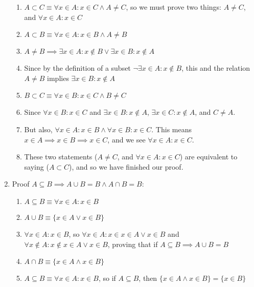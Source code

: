 \documentclass{article}
\begin{document}
\begin{enumerate}
\begin{enumerate}
                \item $A \subset C \equiv \forall x \in A: x \in C \land A \neq C$, so we must prove
                    two things: $A \neq C$, and $\forall x \in A: x \in C$
                \item $A \subset B \equiv \forall x \in A: x \in B \land A \neq B$
                \item $A \neq B \implies \exists x \in A: x \notin B \lor \exists x \in B: x \notin A$
                \item Since by the definition of a subset $\neg\exists x \in A:
                    x \notin B$, this and the relation $A \neq B$ implies
                    $\exists x \in B: x \notin A$
                \item $B \subset C \equiv \forall x \in B: x \in C \land B \neq C$
                \item Since $\forall x \in B: x \in C$ and $\exists x \in B: x
                    \notin A$, $\exists x \in C: x \notin A$, and $C \neq A$.
                \item But also, $\forall x \in A: x \in B \land \forall x \in B: x \in C$. This
                    means $x \in A \implies x \in B \implies x \in C$, and we see $\forall x \in A: x \in C$.
                \item These two statements ($A \neq C$, and $\forall x \in A: x \in C$) are equivalent
                    to saying ($A \subset C$), and so we have finished our proof.
            \end{enumerate}
        \item Proof $A \subseteq B \implies A \cup B = B \land A \cap B = B$:
            \begin{enumerate}
                \item $A \subseteq B \equiv \forall x \in A: x \in B$
                \item $A \cup B \equiv \{x \in A \lor x \in B\}$
                \item $\forall x \in A: x \in B$, so $\forall x \in A : x \in
                    {x \in A \lor x \in B}$ and $\forall x \notin A : x \notin
                    {x \in A \lor x \in B}$, proving that if $A \subseteq B
                    \implies A \cup B = B$
                \item $A \cap B \equiv \{x \in A \land x \in B\}$
                \item $A \subseteq B \equiv \forall x \in A: x \in B$, so if $A \subseteq B$, then
                    $\{x \in A \land x \in B\} = \{x \in B\}$

\end{enumerate}
\end{enumerate}
\end{document}
